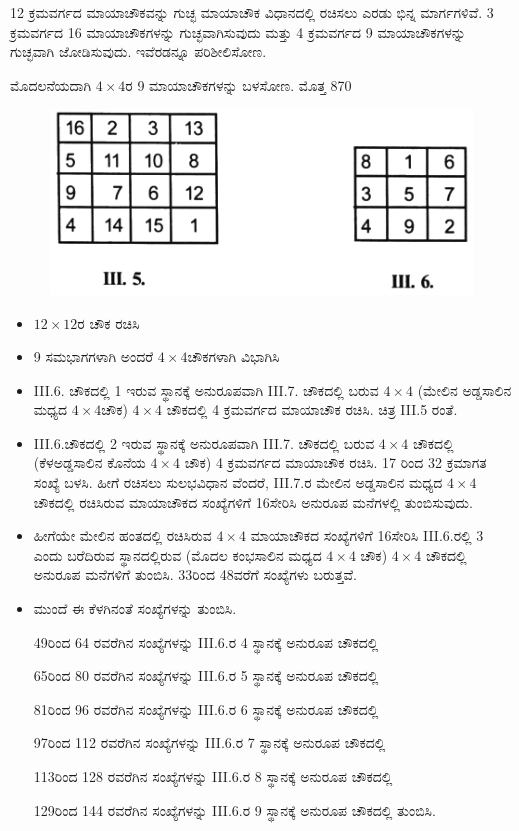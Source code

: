 12 ಕ್ರಮವರ್ಗದ ಮಾಯಾಚೌಕವನ್ನು ಗುಚ್ಛ ಮಾಯಾಚೌಕ ವಿಧಾನದಲ್ಲಿ ರಚಿಸಲು ಎರಡು ಭಿನ್ನ ಮಾರ್ಗಗಳಿವೆ. 3 ಕ್ರಮವರ್ಗದ 16 ಮಾಯಾಚೌಕಗಳನ್ನು ಗುಚ್ಛವಾಗಿಸು\-ವುದು ಮತ್ತು 4 ಕ್ರಮವರ್ಗದ 9 ಮಾಯಾಚೌಕಗಳನ್ನು ಗುಚ್ಛವಾಗಿ ಜೋಡಿಸುವುದು. ಇವೆರಡನ್ನೂ ಪರಿಶೀಲಿಸೋಣ.

ಮೊದಲನೆಯದಾಗಿ $4 \times 4$ರ 9 ಮಾಯಾಚೌಕಗಳನ್ನು ಬಳಸೋಣ. ಮೊತ್ತ 870

\begin{figure}[H]
\includegraphics{src/figures/chap3/fig3-34.jpg}
\end{figure}

\begin{itemize}
	\item $12 \times 12$ರ ಚೌಕ ರಚಿಸಿ
	\item 9 ಸಮಭಾಗಗಳಾಗಿ ಅಂದರೆ $4 \times 4$ಚೌಕಗಳಾಗಿ ವಿಭಾಗಿಸಿ
	\item  III.6. ಚೌಕದಲ್ಲಿ 1 ಇರುವ ಸ್ಥಾನಕ್ಕೆ ಅನುರೂಪವಾಗಿ  III.7. ಚೌಕದಲ್ಲಿ ಬರುವ $4 \times 4$ (ಮೇಲಿನ ಅಡ್ಡಸಾಲಿನ ಮಧ್ಯದ $4 \times 4$ಚೌಕ) $4 \times 4$ ಚೌಕದಲ್ಲಿ 4 ಕ್ರಮವರ್ಗದ ಮಾಯಾಚೌಕ ರಚಿಸಿ. ಚಿತ್ರ  III.5 ರಂತೆ.
	\item  III.6.ಚೌಕದಲ್ಲಿ 2 ಇರುವ ಸ್ಥಾನಕ್ಕೆ ಅನುರೂಪವಾಗಿ  III.7. ಚೌಕದಲ್ಲಿ ಬರುವ $4 \times 4$ ಚೌಕದಲ್ಲಿ (ಕೆಳಅಡ್ಡಸಾಲಿನ ಕೊನೆಯ $4 \times 4$ ಚೌಕ) 4 ಕ್ರಮವರ್ಗದ ಮಾಯಾಚೌಕ 
	ರಚಿಸಿ. 17 ರಿಂದ 32 ಕ್ರಮಾಗತ ಸಂಖ್ಯೆ ಬಳಸಿ. ಹೀಗೆ ರಚಿಸಲು ಸುಲಭವಿಧಾನ ವೆಂದರೆ,  III.7.ರ ಮೇಲಿನ ಅಡ್ಡಸಾಲಿನ ಮಧ್ಯದ $4 \times 4$ ಚೌಕದಲ್ಲಿ ರಚಿಸಿರುವ ಮಾಯಾಚೌಕದ ಸಂಖ್ಯೆಗಳಿಗೆ 16ಸೇರಿಸಿ ಅನುರೂಪ ಮನೆಗಳಲ್ಲಿ ತುಂಬಿಸುವುದು.
	\item ಹೀಗೆಯೇ ಮೇಲಿನ ಹಂತದಲ್ಲಿ ರಚಿಸಿರುವ $4 \times 4$ ಮಾಯಾಚೌಕದ ಸಂಖ್ಯೆಗಳಿಗೆ 16ಸೇರಿಸಿ  III.6.ರಲ್ಲಿ 3 ಎಂದು ಬರೆದಿರುವ ಸ್ಥಾನದಲ್ಲಿರುವ (ಮೊದಲ ಕಂಭಸಾಲಿನ ಮಧ್ಯದ $4 \times 4$ ಚೌಕ) $4 \times 4$ ಚೌಕದಲ್ಲಿ ಅನುರೂಪ ಮನೆಗಳಿಗೆ ತುಂಬಿಸಿ. 33ರಿಂದ 48ವರೆಗೆ ಸಂಖ್ಯೆಗಳು ಬರುತ್ತವೆ.
	\item ಮುಂದೆ ಈ ಕೆಳಗಿನಂತೆ ಸಂಖ್ಯೆಗಳನ್ನು ತುಂಬಿಸಿ.

	49ರಿಂದ 64 ರವರೆಗಿನ ಸಂಖ್ಯೆಗಳನ್ನು  III.6.ರ 4 ಸ್ಥಾನಕ್ಕೆ ಅನುರೂಪ ಚೌಕದಲ್ಲಿ

	65ರಿಂದ 80 ರವರೆಗಿನ ಸಂಖ್ಯೆಗಳನ್ನು  III.6.ರ 5 ಸ್ಥಾನಕ್ಕೆ ಅನುರೂಪ ಚೌಕದಲ್ಲಿ

	81ರಿಂದ 96 ರವರೆಗಿನ ಸಂಖ್ಯೆಗಳನ್ನು  III.6.ರ 6 ಸ್ಥಾನಕ್ಕೆ ಅನುರೂಪ ಚೌಕದಲ್ಲಿ

	97ರಿಂದ 112 ರವರೆಗಿನ ಸಂಖ್ಯೆಗಳನ್ನು  III.6.ರ 7 ಸ್ಥಾನಕ್ಕೆ ಅನುರೂಪ ಚೌಕದಲ್ಲಿ

	113ರಿಂದ 128 ರವರೆಗಿನ ಸಂಖ್ಯೆಗಳನ್ನು  III.6.ರ 8 ಸ್ಥಾನಕ್ಕೆ ಅನುರೂಪ ಚೌಕದಲ್ಲಿ

	129ರಿಂದ 144 ರವರೆಗಿನ ಸಂಖ್ಯೆಗಳನ್ನು  III.6.ರ 9 ಸ್ಥಾನಕ್ಕೆ ಅನುರೂಪ ಚೌಕದಲ್ಲಿ ತುಂಬಿಸಿ.
\end{itemize}

